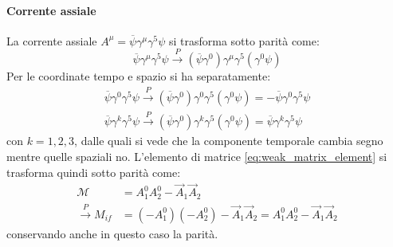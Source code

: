 \documentclass{subnucbo}
\begin{document}
\paragraph{Corrente assiale} La corrente assiale $A ^ { \mu } = \overline { \psi } \gamma ^ { \mu } \gamma ^ { 5 } \psi$ si trasforma sotto parità come:
\begin{equation}
        \overline { \psi } \gamma ^ { \mu } \gamma ^ { 5 } \psi \stackrel { P } { \rightarrow } \left( \overline { \psi } \gamma ^ { 0 } \right) \gamma ^ { \mu } \gamma ^ { 5 } \left( \gamma ^ { 0 } \psi \right)
\end{equation}
Per le coordinate tempo e spazio si ha separatamente:
\begin{equation}
        \begin{array} { l } { \overline { \psi } \gamma ^ { 0 } \gamma ^ { 5 } \psi \stackrel { P } { \rightarrow } \left( \overline { \psi } \gamma ^ { 0 } \right) \gamma ^ { 0 } \gamma ^ { 5 } \left( \gamma ^ { 0 } \psi \right) = - \overline { \psi } \gamma ^ { 0 } \gamma ^ { 5 } \psi } \\ { \overline { \psi } \gamma ^ { k } \gamma ^ { 5 } \psi \stackrel { P } { \rightarrow } \left( \overline { \psi } \gamma ^ { 0 } \right) \gamma ^ { k } \gamma ^ { 5 } \left( \gamma ^ { 0 } \psi \right) = \overline { \psi } \gamma ^ { k } \gamma ^ { 5 } \psi } \end{array}
\end{equation}
con $k=1,2,3$, dalle quali si vede che la componente temporale cambia segno mentre quelle spaziali no. L'elemento di matrice \ref{eq:weak_matrix_element} si trasforma quindi sotto parità come:
\begin{equation}
        \begin{aligned}
                \mathcal{M} & = A _ { 1 } ^ { 0 } A _ { 2 } ^ { 0 } - \vec { A } _ { 1 } \vec { A } _ { 2 } \\ \stackrel { P } { \rightarrow } M _ { i f } & = \left( - A _ { 1 } ^ { 0 } \right) \left( - A _ { 2 } ^ { 0 } \right) - \vec { A } _ { 1 } \vec { A } _ { 2 } = A _ { 1 } ^ { 0 } A _ { 2 } ^ { 0 } - \vec { A } _ { 1 } \vec { A } _ { 2 }
        \end{aligned}
\end{equation}
conservando anche in questo caso la parità.
\end{document}
